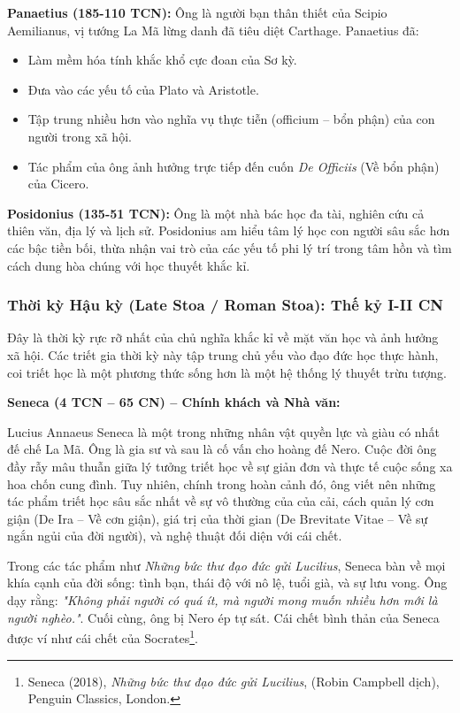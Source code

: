 \textbf{Panaetius (185-110 TCN):} Ông là người bạn thân thiết của Scipio Aemilianus, vị tướng La Mã lừng danh đã tiêu diệt Carthage. Panaetius đã:
\begin{itemize}[leftmargin=1.5cm]
    \item Làm mềm hóa tính khắc khổ cực đoan của Sơ kỳ.
    \item Đưa vào các yếu tố của Plato và Aristotle.
    \item Tập trung nhiều hơn vào nghĩa vụ thực tiễn (officium – bổn phận) của con người trong xã hội.
    \item Tác phẩm của ông ảnh hưởng trực tiếp đến cuốn \textit{De Officiis} (Về bổn phận) của Cicero.
\end{itemize}

\textbf{Posidonius (135-51 TCN):} Ông là một nhà bác học đa tài, nghiên cứu cả thiên văn, địa lý và lịch sử. Posidonius am hiểu tâm lý học con người sâu sắc hơn các bậc tiền bối, thừa nhận vai trò của các yếu tố phi lý trí trong tâm hồn và tìm cách dung hòa chúng với học thuyết khắc kỉ.

\subsubsection{Thời kỳ Hậu kỳ (Late Stoa / Roman Stoa): Thế kỷ I-II CN}

Đây là thời kỳ rực rỡ nhất của chủ nghĩa khắc kỉ về mặt văn học và ảnh hưởng xã hội. Các triết gia thời kỳ này tập trung chủ yếu vào đạo đức học thực hành, coi triết học là một phương thức sống hơn là một hệ thống lý thuyết trừu tượng.

\textbf{Seneca (4 TCN – 65 CN) – Chính khách và Nhà văn:}

Lucius Annaeus Seneca là một trong những nhân vật quyền lực và giàu có nhất đế chế La Mã. Ông là gia sư và sau là cố vấn cho hoàng đế Nero. Cuộc đời ông đầy rẫy mâu thuẫn giữa lý tưởng triết học về sự giản đơn và thực tế cuộc sống xa hoa chốn cung đình. Tuy nhiên, chính trong hoàn cảnh đó, ông viết nên những tác phẩm triết học sâu sắc nhất về sự vô thường của của cải, cách quản lý cơn giận (De Ira – Về cơn giận), giá trị của thời gian (De Brevitate Vitae – Về sự ngắn ngủi của đời người), và nghệ thuật đối diện với cái chết.

Trong các tác phẩm như \textit{Những bức thư đạo đức gửi Lucilius}, Seneca bàn về mọi khía cạnh của đời sống: tình bạn, thái độ với nô lệ, tuổi già, và sự lưu vong. Ông dạy rằng: \textit{"Không phải người có quá ít, mà người mong muốn nhiều hơn mới là người nghèo."}. Cuối cùng, ông bị Nero ép tự sát. Cái chết bình thản của Seneca được ví như cái chết của Socrates\footnote{Seneca (2018), \textit{Những bức thư đạo đức gửi Lucilius}, (Robin Campbell dịch), Penguin Classics, London.}.

